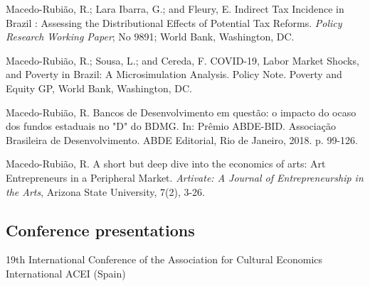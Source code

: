 \documentclass[11pt,letterpaper]{report}
\begin{document}
    \begin{tablist}

        \item[2021] \tab{}Macedo-Rubi\~ao, R.; Lara Ibarra, G.; and Fleury, E. Indirect Tax Incidence in Brazil : Assessing the Distributional Effects of Potential Tax Reforms. \emph{Policy Research Working Paper}; No 9891; World Bank, Washington, DC.

        \item[2020] \tab{}Macedo-Rubi\~ao, R.; Sousa, L.; and Cereda, F. COVID-19, Labor Market Shocks, and Poverty in Brazil: A Microsimulation Analysis. Policy Note. Poverty and Equity GP, World Bank,  Washington, DC.

        \item[2018] \tab{}Macedo-Rubi\~ao, R. Bancos de Desenvolvimento em quest\~ao: o impacto do ocaso dos fundos estaduais no "D" do BDMG. In: Pr\^emio ABDE-BID. Associa\c{c}\~ao Brasileira de Desenvolvimento. ABDE Editorial,  Rio de Janeiro, 2018. p. 99-126.

        \item[2017] \tab{}Macedo-Rubi\~ao, R. A short but deep dive into the economics of arts: Art Entrepreneurs in a Peripheral Market. \textit{Artivate: A Journal of Entrepreneurship in the Arts}, Arizona State University, 7(2), 3-26.

    \end{tablist}

    \subsection*{Conference presentations}

    \begin{tablist}
    \item[2016] \tab{} 19th International Conference of the Association for Cultural Economics International ACEI (Spain)

     \end{tablist}



\end{document}
